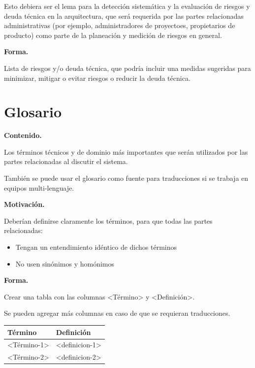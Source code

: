 \documentclass[]{article}
\begin{document}
Esto debiera ser el lema para la detección sistemática y la evaluación
de riesgos y deuda técnica en la arquitectura, que será requerida por
las partes relacionadas administrativas (por ejemplo, administradores de
proyectoes, propietarios de producto) como parte de la planeación y
medición de riesgos en general.

\textbf{Forma.}

Lista de riesgos y/o deuda técnica, que podría incluir una medidas
sugeridas para minimizar, mitigar o evitar riesgos o reducir la deuda
técnica.

\hypertarget{section-glossary}{%
\section{Glosario}\label{section-glossary}}

\textbf{Contenido.}

Los términos técnicos y de dominio más importantes que serán utilizados
por las partes relacionadas al discutir el sistema.

También se puede usar el glosario como fuente para traducciones si se
trabaja en equipos multi-lenguaje.

\textbf{Motivación.}

Deberían definirse claramente los términos, para que todas las partes
relacionadas:

\begin{itemize}
\item
  Tengan un entendimiento idéntico de dichos términos
\item
  No usen sinónimos y homónimos
\end{itemize}

\textbf{Forma.}

Crear una tabla con las columnas \textless{}Término\textgreater{} y
\textless{}Definición\textgreater{}.

Se pueden agregar más columnas en caso de que se requieran traducciones.

\begin{longtable}[]{@{}ll@{}}
\toprule
\begin{minipage}[b]{0.47\columnwidth}\raggedright
Término\strut
\end{minipage} & \begin{minipage}[b]{0.47\columnwidth}\raggedright
Definición\strut
\end{minipage}\tabularnewline
\midrule
\endhead
\begin{minipage}[t]{0.47\columnwidth}\raggedright
\textless{}Término-1\textgreater{}\strut
\end{minipage} & \begin{minipage}[t]{0.47\columnwidth}\raggedright
\textless{}definicion-1\textgreater{}\strut
\end{minipage}\tabularnewline
\begin{minipage}[t]{0.47\columnwidth}\raggedright
\textless{}Término-2\textgreater{}\strut
\end{minipage} & \begin{minipage}[t]{0.47\columnwidth}\raggedright
\textless{}definicion-2\textgreater{}\strut
\end{minipage}\tabularnewline
\bottomrule
\end{longtable}
\end{document}
